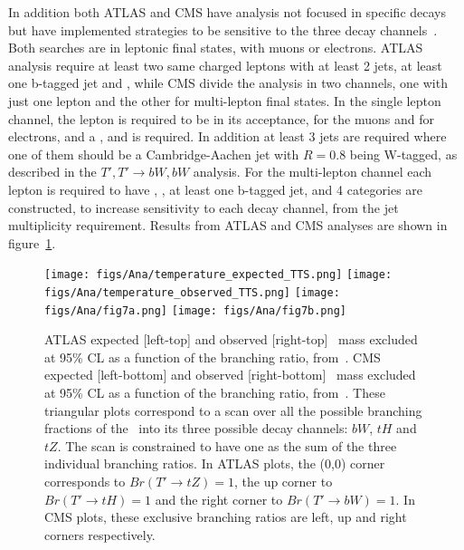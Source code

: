 In addition both ATLAS and CMS have analysis not focused in specific decays but have implemented strategies to be sensitive to the three decay channels~\cite{Aad:2015gdg,Chatrchyan:2013uxa}. Both searches are in leptonic final states, with muons or electrons. ATLAS analysis require at least two same charged leptons with at least 2 jets, at least one b-tagged jet and , while CMS divide the analysis in two channels, one with just one lepton and the other for multi-lepton final states. In the single lepton channel, the lepton is required to be in its acceptance,  for the muons and  for electrons, and a , and  is required. In addition at least 3 jets are required where one of them should be a Cambridge-Aachen jet with $R=0.8$ being W-tagged, as described in the $T',T'\rightarrow bW,bW$ analysis. For the multi-lepton channel each lepton is required to have , , at least one b-tagged jet, and 4 categories are constructed, to increase sensitivity to each decay channel, from the jet multiplicity requirement. Results from ATLAS and CMS analyses are shown in figure~\ref{fig:ATLASCMSres}.   

\begin{figure}[!Hhtbp]
  \begin{center}
    \texttt{[image: figs/Ana/temperature\_expected\_TTS.png]}
    \texttt{[image: figs/Ana/temperature\_observed\_TTS.png]}
    \texttt{[image: figs/Ana/fig7a.png]}
    \texttt{[image: figs/Ana/fig7b.png]}
    \caption{ATLAS expected [left-top] and observed [right-top] \Tp~mass excluded at 95\% CL as a function of the branching ratio, from~\cite{Aad:2015gdg}. CMS expected [left-bottom] and observed [right-bottom] \Tp~mass excluded at 95\% CL as a function of the branching ratio, from~\cite{Chatrchyan:2013uxa}. These triangular plots correspond to a scan over all the possible branching fractions of the \Tp~into its three possible decay channels: $bW$, $tH$ and $tZ$. The scan is constrained to have one as the sum of the three individual branching ratios. In ATLAS plots, the (0,0) corner corresponds to $Br(T'\rightarrow tZ)=1$, the up corner to $Br(T'\rightarrow tH)=1$ and the right corner to $Br(T'\rightarrow bW)=1$. In CMS plots, these exclusive branching ratios are left, up and right corners respectively.}
    \label{fig:ATLASCMSres}
  \end{center}
\end{figure}

